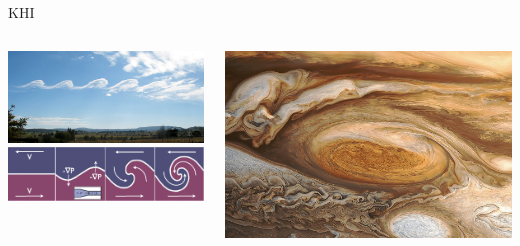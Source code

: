 \documentclass[10pt,aspectratio=169,usenames,dvipsnames]{beamer}
\begin{document}

\begin{frame}{KHI}
\begin{columns}
\begin{column}{0.6\textwidth}
\includegraphics[width=0.95\linewidth]{2023Dundee/Figures/Wavecloudsduval.jpeg} \\
\includegraphics[width=0.95\linewidth]{2023Dundee/Figures/khischematic.png}
\end{column}
\begin{column}{0.4\textwidth}
\includegraphics[width=0.95\linewidth]{2023Dundee/Figures/jupiter.png}
\end{column}
\end{columns}
\end{frame}
\end{document}
